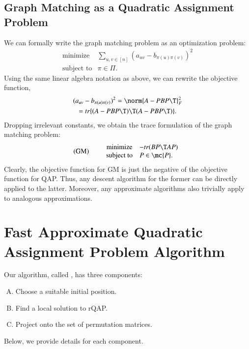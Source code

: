 \documentclass[preprint,11pt]{elsarticle}
\begin{document}
\subsection{Graph Matching as a Quadratic Assignment Problem}

We can formally write the graph matching problem as an optimization problem:
\begin{equation*}
\begin{array}{cl}
			\text{minimize}   &\sum_{u,v \in [n]} (a_{uv}-b_{\pi(u)\pi(v)})^2 \\
			\text{subject to}  &\pi \in \Pi.   
\end{array}\label{eq:GM}
\end{equation*}
Using the same linear algebra notation as above, we can rewrite the objective function, 
\begin{multline} \label{eq:equiv}
(a_{uv}-b_{\pi(u)\pi(v)})^2 = \norm{A - PBP\T}_F^2 \\ = tr \{ (A - PBP\T)\T (A - PBP\T)\}.
\end{multline}
Dropping irrelevant constants, we obtain the trace formulation of the graph matching problem:
\begin{equation}
\text{(GM)} \qquad  
\begin{array}{cl}
			\text{minimize}   & - tr(B P\T AP) \\
			\text{subject to}  &P \in \mc{P}.   
\end{array}\label{eq:GM}
\end{equation}
Clearly, the objective function for GM is just the negative of the objective function for QAP. Thus, any descent algorithm for the former can be directly applied to the latter.  Moreover, any approximate algorithms also trivially apply to analogous approximations.





\section{Fast Approximate Quadratic Assignment Problem Algorithm} %
\label{sec:FAQ}


Our algorithm, called \FAQ, has three components:
\begin{enumerate}[A.]
	\item Choose a suitable initial position. %
	\item Find a local solution to rQAP. %
	\item Project onto the set of permutation matrices. %
\end{enumerate}
Below, we provide details for each component.
\end{document}
